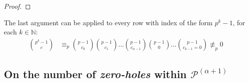\begin{proof}

\end{proof}

  The 
  last argument can be applied to every row with index of
  the form $p^k -1$, for each $k\in\mathbb{N}$:
  \begin{displaymath}
    \begin{split}
      {{p^k-1} \choose {c}} &\equiv_{p} {{p-1} \choose {c_0}} {{p-1} \choose {c_1}} \ldots 
      {{p-1} \choose {c_{{\alpha}-1}}}{{p-1} \choose {0}}\ldots{{p-1} \choose {c_{k-1}=0}} \not\equiv_{p} 0
    \end{split}
  \end{displaymath}


\subsection{On the number of \emph{zero-holes} within 
    $\mathcal{P}^{(\alpha+1)}$}

